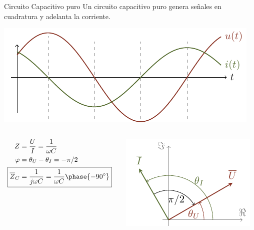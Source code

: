 \documentclass[aspectratio=169, usenames,svgnames,dvipsnames]{beamer}
\begin{document}
\begin{frame}[label={sec:orgf120d7a}]{Circuito Capacitivo puro}
Un circuito capacitivo puro genera \alert{señales en cuadratura} y \alert{adelanta la corriente}.

\begin{center}
\includegraphics[height=0.3\textheight]{../figs/capacitivoPuro.pdf}
\end{center}

\begin{columns}
\begin{column}{0.3\columnwidth}
\begin{align*}
  Z &= \dfrac{U}{I} = \dfrac{1}{\omega C}\\
  \varphi &= \theta_U - \theta_I = - \pi/2\\
  \Aboxed{\overline{Z}_C &= \dfrac{1}{j\omega C} = \dfrac{1}{\omega C}\phase{\ang{-90}}}
\end{align*}
\end{column}


\begin{column}{0.4\columnwidth}
\begin{center}
\includegraphics[height=0.4\textheight]{../figs/fasorCondensador_VI.pdf}
\end{center}
\end{column}



\end{columns}
\end{frame}
\end{document}
